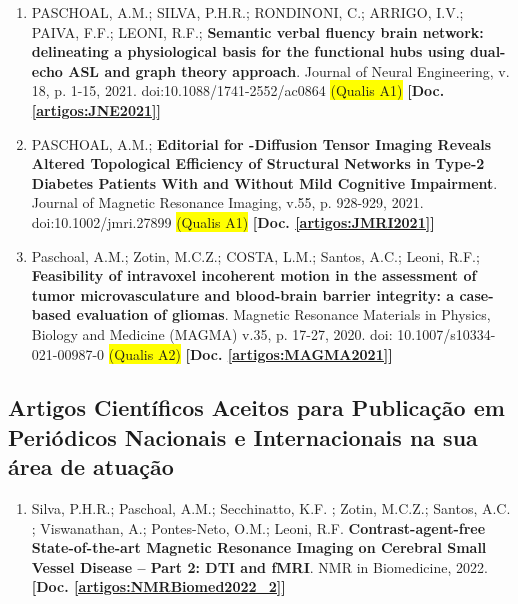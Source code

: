 \documentclass[a4paper,oneside,10pt]{article}
\begin{document}
\begin{enumerate}
        \item PASCHOAL, A.M.; SILVA, P.H.R.; RONDINONI, C.; ARRIGO, I.V.; PAIVA, F.F.; LEONI, R.F.; \textbf{Semantic verbal fluency brain network: delineating a physiological basis for the functional hubs using dual-echo ASL and graph theory approach}. Journal of Neural Engineering, v. 18, p. 1-15, 2021. doi:10.1088/1741-2552/ac0864 \colorbox{yellow}{(Qualis A1)} \textbf{[Doc. \ref{artigos:JNE2021}]}
        
        \item PASCHOAL, A.M.; \textbf{Editorial for -Diffusion Tensor Imaging Reveals Altered Topological Efficiency of Structural Networks in Type-2 Diabetes Patients With and Without Mild Cognitive Impairment}. Journal of Magnetic Resonance Imaging, v.55, p. 928-929, 2021. doi:10.1002/jmri.27899 \colorbox{yellow}{(Qualis A1)} \textbf{[Doc. \ref{artigos:JMRI2021}]} 
        
        \item Paschoal, A.M.; Zotin, M.C.Z.; COSTA, L.M.; Santos, A.C.; Leoni, R.F.; \textbf{Feasibility of intravoxel incoherent motion in the assessment of tumor microvasculature and blood-brain barrier integrity: a case-based evaluation of gliomas}. Magnetic Resonance Materials in Physics, Biology and Medicine (MAGMA) v.35, p. 17-27, 2020. doi: 10.1007/s10334-021-00987-0 \colorbox{yellow}{(Qualis A2)} \textbf{[Doc. \ref{artigos:MAGMA2021}]}

\end{enumerate}

\subsection{Artigos Científicos Aceitos para Publicação em Periódicos Nacionais e Internacionais na sua área de atuação}
\vspace{0.3cm}

\begin{enumerate}
        \renewcommand{\labelenumi}{{\large\bfseries\arabic{enumi}.}}
        
        \item Silva, P.H.R.; Paschoal, A.M.; Secchinatto, K.F. ; Zotin, M.C.Z.; Santos, A.C. ; Viswanathan, A.; Pontes-Neto, O.M.; Leoni, R.F. \textbf{Contrast-agent-free State-of-the-art Magnetic Resonance Imaging on Cerebral Small Vessel Disease – Part 2: DTI and fMRI}. NMR in Biomedicine, 2022.  \textbf{[Doc. \ref{artigos:NMRBiomed2022_2}]}
        
\end{enumerate}
\end{document}

